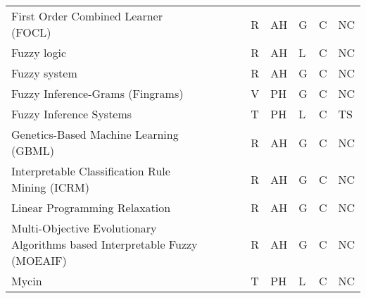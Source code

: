 \documentclass[final,1p,times]{elsarticle}
\begin{document}
\begin{table}[htbp]
\begin{tabular}{m{3.5cm} m{2cm} m{0.5cm} m{0.5cm} m{0.85cm} m{0.5cm} m{0.6cm} m{0.8cm} m{0.6cm}}
    First Order Combined Learner (FOCL) &  \citeauthor{pazzani1997comprehensible} &  \cite{pazzani1997comprehensible} &  \citeyear{pazzani1997comprehensible} & R & AH & G & C & NC\\
    Fuzzy logic &  \citeauthor{pierrard2018learning} &  \cite{pierrard2018learning} &  \citeyear{pierrard2018learning} & R & AH & L & C & NC\\
    Fuzzy system &  \citeauthor{jin2000fuzzy} &  \cite{jin2000fuzzy} &  \citeyear{jin2000fuzzy} & R & AH & G & C & NC\\
    Fuzzy Inference-Grams (Fingrams) &  \citeauthor{pancho2013fingrams} &  \cite{pancho2013fingrams} &  \citeyear{pancho2013fingrams} & V & PH & G & C & NC\\
    Fuzzy Inference Systems &  \citeauthor{keneni2019evolving} &  \cite{keneni2019evolving} &  \citeyear{keneni2019evolving} & T & PH & L & C & TS\\
    Genetics-Based Machine Learning (GBML) &  \citeauthor{ishibuchi2007analysis} &  \cite{ishibuchi2007analysis} &  \citeyear{ishibuchi2007analysis} & R & AH & G & C & NC\\
    Interpretable Classification Rule Mining (ICRM) &  \citeauthor{cano2013interpretable} &  \cite{cano2013interpretable} &  \citeyear{cano2013interpretable} & R & AH & G & C & NC\\
    Linear Programming Relaxation &  \citeauthor{malioutov2017learning, su2016interpretable} &  \cite{malioutov2017learning, su2016interpretable} &  \citeyear{malioutov2017learning, su2016interpretable} & R & AH & G & C & NC\\
    Multi-Objective Evolutionary Algorithms based Interpretable Fuzzy (MOEAIF) &  \citeauthor{wang2011building} &  \cite{wang2011building} &  \citeyear{wang2011building} & R & AH & G & C & NC\\
    Mycin &  \citeauthor{shortliffe1975computer} &  \cite{shortliffe1975computer} &  \citeyear{shortliffe1975computer} & T & PH & L & C & NC\\
    \hline
\end{tabular}
\end{table}
\end{document}
